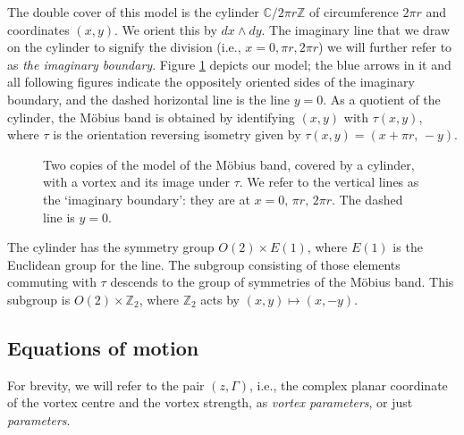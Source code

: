 \documentclass[11pt,twoside]{article}
\theoremstyle{definition}
\numberwithin{equation}{section}
\begin{document}
The double cover of this model is the cylinder $\mathbb{C}/2\pi r \mathbb{Z}$ of circumference $2\pi r$ and coordinates $(x,y)$. We orient this by $dx\wedge dy$.  The imaginary line that we draw on the cylinder to signify the division (i.e., $x=0,\pi r, 2\pi r$) we will further refer to as 
\textit{the imaginary boundary}. Figure \ref{fig:Mb} depicts our model; the blue arrows in it and all following figures indicate the oppositely oriented sides of the imaginary boundary, and the dashed horizontal line is the line $y=0$. As a quotient of the cylinder, the M\"obius band is obtained by identifying $(x,y)$ with $\tau(x,y)$, where $\tau$ is the orientation reversing isometry given by $\tau(x,y)=(x+\pi r,\,-y)$.  


\begin{figure}
\centering
{}
\caption{Two copies of the model of the M\"obius band, covered by a cylinder, with a vortex and its image under $\tau$. We refer to the vertical lines as the `imaginary boundary': they are at $x=0,\, \pi r,\, 2\pi r$.  The dashed line is $y=0$.}
\label{fig:Mb}
\end{figure}


The cylinder has the symmetry group $O(2)\times E(1)$, where $E(1)$ is the Euclidean group for the line. The subgroup consisting of those elements commuting with $\tau$ descends to the group of symmetries of the M\"obius band.  This subgroup is $O(2)\times\mathbb{Z}_2$, where $\mathbb{Z}_2$ acts by $(x,y)\mapsto (x,-y)$. 


\subsection{Equations of motion}

For brevity, we will refer to the pair $(z,\Gamma)$, i.e.,  the complex planar coordinate of the vortex centre and the vortex strength, as \textit{vortex parameters}, or just \textit{parameters}.
\end{document}
